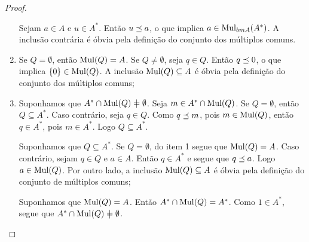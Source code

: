 \begin{proof}
\begin{enumerate}
	Sejam $a \in A$ e $u \in A^*$. Então $u \preceq a$, o que implica $a \in \operatorname{Mul}_{\\bm A}(A^*)$. A inclusão contrária é óbvia pela definição do conjunto dos múltiplos comuns.

	\item Se $Q = \emptyset$, então $\operatorname{Mul}(Q) = A$. Se $Q \neq \emptyset$, seja $q \in Q$. Então $q \preceq 0$, o que implica $\{0\} \in \operatorname{Mul}(Q)$. A inclusão $\operatorname{Mul}(Q) \subseteq A$ é óbvia pela definição do conjunto dos múltiplos comuns;

	\item Suponhamos que $A^* \cap \mul(Q) \neq \emptyset$. Seja $m \in A^* \cap \operatorname{Mul}(Q)$. Se $Q = \emptyset$, então $Q \subseteq A^*$. Caso contrário, seja $q \in Q$. Como $q \preceq m$, pois $m \in \operatorname{Mul}(Q)$, então $q \in A^*$, pois $m \in A^*$. Logo $Q \subseteq A^*$.

	Suponhamos que $Q \subseteq A^*$. Se $Q = \emptyset$, do item 1 segue que $\operatorname{Mul}(Q)=A$. Caso contrário, sejam $q \in Q$ e $a \in A$. Então $q \in A^*$ e segue que $q \preceq a$. Logo $a \in \operatorname{Mul}(Q)$. Por outro lado, a  inclusão $\operatorname{Mul}(Q) \subseteq A$ é óbvia pela definição do conjunto de múltiplos comuns;

	Suponhamos que $\operatorname{Mul}(Q) = A$. Então $A^* \cap \operatorname{Mul}(Q) = A^*$. Como $1 \in A^*$, segue que $A^* \cap \mul(Q) \neq \emptyset$. \qedhere
	\end{enumerate}
\end{proof}




